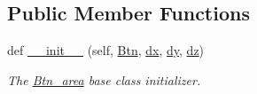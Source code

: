 \subsection*{Public Member Functions}
\begin{DoxyCompactItemize}
\item 
def \hyperlink{classRET__config_1_1Btn__area_a950cef8a3171324f99f08291a29675d0}{\+\_\+\+\_\+init\+\_\+\+\_\+} (self, \hyperlink{classRET__config_1_1Btn}{Btn}, \hyperlink{classRET__config_1_1Btn__area_aacddc911cdfe5cd5ec97b084754542d4}{dx}, \hyperlink{classRET__config_1_1Btn__area_a22b1a06ae09d552a5ca668a07885ebf1}{dy}, \hyperlink{classRET__config_1_1Btn__area_a71f0caccd6959b358543ee9cdc9b9c3e}{dz})
\begin{DoxyCompactList}\small\item\em The \hyperlink{classRET__config_1_1Btn__area}{Btn\+\_\+area} base class initializer. \end{DoxyCompactList}\end{DoxyCompactItemize}
